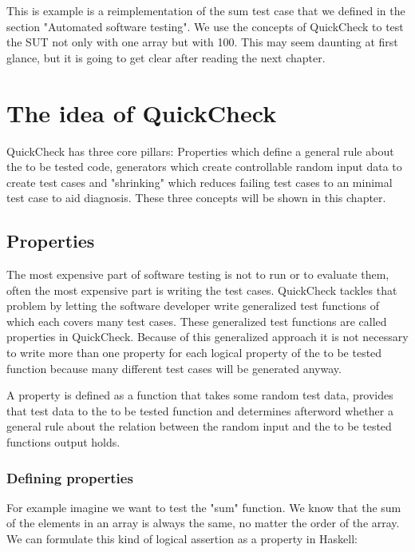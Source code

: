 \documentclass[a4paper, 12pt]{article} %
\begin{document}
This is example is a reimplementation of the sum test case that we defined in the section "Automated software testing". We use the concepts of QuickCheck to test the SUT not only with one array but with 100. This may seem daunting at first glance, but it is going to get clear after reading the next chapter.

\newpage
\section{The idea of QuickCheck}

QuickCheck has three core pillars: Properties which define a general rule about the to be tested code, generators which create controllable random input data to create test cases and "shrinking" which reduces failing test cases to an minimal test case to aid diagnosis. These three concepts will be shown in this chapter.

\subsection{Properties}

The most expensive part of software testing is not to run or to evaluate them, often the most expensive part is writing the test cases. QuickCheck tackles that problem by letting the software developer write generalized test functions of which each covers many test cases. These generalized test functions are called properties in QuickCheck. \cite{Hughes2010} Because of this generalized approach it is not necessary to write more than one property for each logical property of the to be tested function because many different test cases will be generated anyway. \cite{Hughes2006}

A property is defined as a function that takes some random test data, provides that test data to the to be tested function and determines afterword whether a general rule about the relation between the random input and the to be tested functions output holds.

\subsubsection{Defining properties}

For example imagine we want to test the "sum" function. We know that the sum of the elements in an array is always the same, no matter the order of the array. We can formulate this kind of logical assertion as a property in Haskell:
\end{document}
